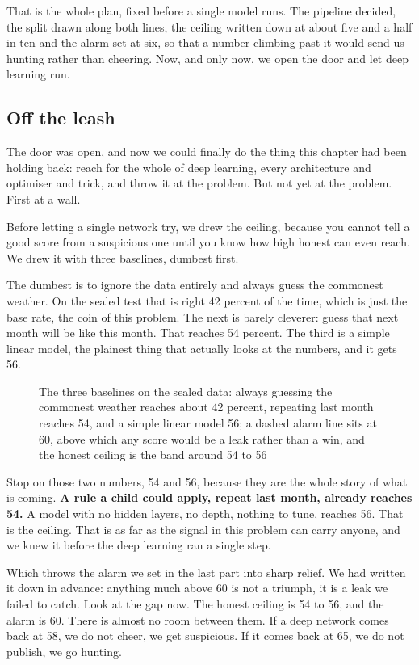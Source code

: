 \documentclass[11pt]{article} %
\begin{document}
That is the whole plan, fixed before a single model runs. The pipeline decided, the split drawn along both lines, the ceiling written down at about five and a half in ten and the alarm set at six, so that a number climbing past it would send us hunting rather than cheering. Now, and only now, we open the door and let deep learning run.


\subsection{Off the leash}


The door was open, and now we could finally do the thing this chapter had been holding back: reach for the whole of deep learning, every architecture and optimiser and trick, and throw it at the problem. But not yet at the problem. First at a wall.

Before letting a single network try, we drew the ceiling, because you cannot tell a good score from a suspicious one until you know how high honest can even reach. We drew it with three baselines, dumbest first.

The dumbest is to ignore the data entirely and always guess the commonest weather. On the sealed test that is right 42 percent of the time, which is just the base rate, the coin of this problem. The next is barely cleverer: guess that next month will be like this month. That reaches 54 percent. The third is a simple linear model, the plainest thing that actually looks at the numbers, and it gets 56.

\begin{figure}[htbp]
\centering

\caption{The three baselines on the sealed data: always guessing the commonest weather reaches about 42 percent, repeating last month reaches 54, and a simple linear model 56; a dashed alarm line sits at 60, above which any score would be a leak rather than a win, and the honest ceiling is the band around 54 to 56}
\end{figure}


Stop on those two numbers, 54 and 56, because they are the whole story of what is coming. \textbf{A rule a child could apply, repeat last month, already reaches 54.} A model with no hidden layers, no depth, nothing to tune, reaches 56. That is the ceiling. That is as far as the signal in this problem can carry anyone, and we knew it before the deep learning ran a single step.

Which throws the alarm we set in the last part into sharp relief. We had written it down in advance: anything much above 60 is not a triumph, it is a leak we failed to catch. Look at the gap now. The honest ceiling is 54 to 56, and the alarm is 60. There is almost no room between them. If a deep network comes back at 58, we do not cheer, we get suspicious. If it comes back at 65, we do not publish, we go hunting.
\end{document}
